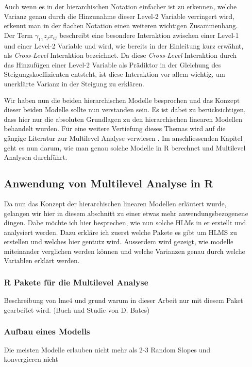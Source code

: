 \documentclass[12pt]{article}\usepackage[]{graphicx}\usepackage[]{color}
\numberwithin{equation}{section}
\begin{document}
Auch wenn es in der hierarchischen Notation einfacher ist zu erkennen, welche Varianz genau durch die Hinzunahme dieser Level-2 Variable verringert wird, erkennt man in der flachen Notation einen weiteren wichtigen Zusammenhang. Der Term $\gamma_{11}z_{j}x_{ij}$ beschreibt eine besondere Interaktion zwischen einer Level-1 und einer Level-2 Variable und wird, wie bereits in der Einleitung kurz erwähnt, als \textit{Cross-Level} Interaktion bezeichnet. Da diese \textit{Cross-Level} Interaktion durch das Hinzufügen einer Level-2 Variable als Prädiktor in der Gleichung des Steigungskoeffizienten entsteht, ist diese Interaktion vor allem wichtig, um unerklärte Varianz in der Steigung zu erklären.

Wir haben nun die beiden hierarchischen Modelle besprochen und das Konzept dieser beiden Modelle sollte nun verstanden sein. Es ist dabei zu berücksichtigen, dass hier nur die absoluten Grundlagen zu den hierarchischen linearen Modellen behandelt wurden. Für eine weitere Vertiefung dieses Themas wird auf die gängige Literatur zur Multilevel Analyse verwiesen \citep{andrew_data, SnijdersTomA.B2012Ma:a, twisk_2006}. Im anschliessenden Kapitel geht es nun darum, wie man genau solche Modelle in R berechnet und Multilevel Analysen durchführt.

\subsection{Anwendung von Multilevel Analyse in R} \label{section:ml_in_R}
Da nun das Konzept der hierarchischen linearen Modellen erläutert wurde, gelangen wir hier in diesem abschnitt zu einer etwas mehr anwendungsbezogenene dingen. Dabe möchte ich hier besprechen, wie nun solche HLMs in er erstellt und analysiert werden. Dazu erkläre ich zuerst welche Pakete es gibt um HLMS zu erstellen und welches hier gentutz wird. Ausserdem wird gezeigt, wie modelle miteinander verglichen werden können und welche Varianzen genau durch welche Variablen erklärt werden. 

\subsubsection{R Pakete für die Multilevel Analyse}
Beschreibung von lme4 und grund warum in dieser Arbeit nur mit diesem Paket gearbeitet wird. (Buch und Studie von D. Bates)
\subsubsection{Aufbau eines Modells}
Die meisten Modelle erlauben nicht mehr als 2-3 Random Slopes und konvergieren nicht \citep{SnijdersTomA.B2012Ma:a}
\end{document}
